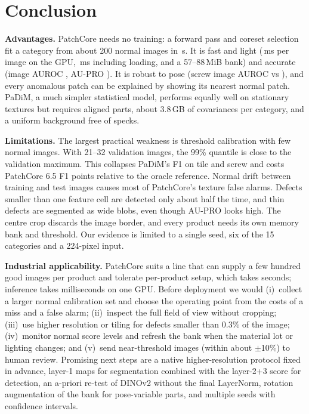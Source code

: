 \section{Conclusion}
\label{sec:conclusion}

\textbf{Advantages.}
PatchCore needs no training: a forward pass and coreset selection fit a category from about 200 normal images in \pcFitAll{}\,s.
It is fast and light (\pcInferAll{}\,ms per image on the GPU, \pcInferEtoEAll{}\,ms including loading, and a 57--88\,MiB bank) and accurate (image AUROC \pcImgAurocAll{}, AU-PRO \pcAuproAll{}).
It is robust to pose (screw image AUROC \pcImgAurocScrew{} vs \pdImgAurocScrew{}), and every anomalous patch can be explained by showing its nearest normal patch.
PaDiM, a much simpler statistical model, performs equally well on stationary textures but requires aligned parts, about 3.8\,GB of covariances per category, and a uniform background free of specks.

\textbf{Limitations.}
The largest practical weakness is threshold calibration with few normal images.
With 21--32 validation images, the 99\% quantile is close to the validation maximum.
This collapses PaDiM's F1 on tile and screw and costs PatchCore 6.5 F1 points relative to the oracle reference.
Normal drift between training and test images causes most of PatchCore's texture false alarms.
Defects smaller than one feature cell are detected only about half the time, and thin defects are segmented as wide blobs, even though AU-PRO looks high.
The centre crop discards the image border, and every product needs its own memory bank and threshold.
Our evidence is limited to a single seed, six of the 15 categories and a 224-pixel input.

\textbf{Industrial applicability.}
PatchCore suits a line that can supply a few hundred good images per product and tolerate per-product setup, which takes seconds; inference takes milliseconds on one GPU.
Before deployment we would
(i)~collect a larger normal calibration set and choose the operating point from the costs of a miss and a false alarm;
(ii)~inspect the full field of view without cropping;
(iii)~use higher resolution or tiling for defects smaller than 0.3\% of the image;
(iv)~monitor normal score levels and refresh the bank when the material lot or lighting changes; and
(v)~send near-threshold images (within about $\pm$10\%) to human review.
Promising next steps are a native higher-resolution protocol fixed in advance, layer-1 maps for segmentation combined with the layer-2+3 score for detection, an a-priori re-test of DINOv2 without the final LayerNorm, rotation augmentation of the bank for pose-variable parts, and multiple seeds with confidence intervals.

